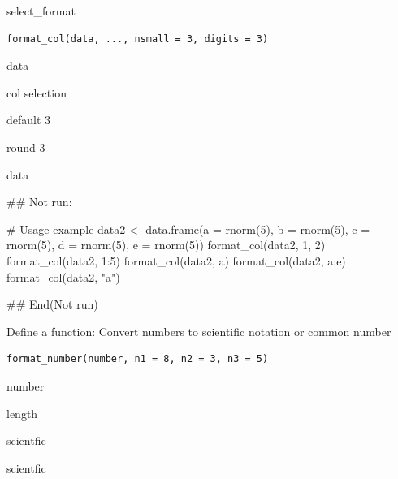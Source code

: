 \documentclass[a4paper]{book}
\begin{document}
%
\begin{Description}
select\_format
\end{Description}
%
\begin{Usage}
\begin{verbatim}
format_col(data, ..., nsmall = 3, digits = 3)
\end{verbatim}
\end{Usage}
%
\begin{Arguments}
\begin{ldescription}
\item[\code{data}] data

\item[\code{...}] col selection

\item[\code{nsmall}] default 3

\item[\code{digits}] round 3
\end{ldescription}
\end{Arguments}
%
\begin{Value}
data
\end{Value}
%
\begin{Examples}
\begin{ExampleCode}


\#\# Not run: 


# Usage example
data2 <- data.frame(a = rnorm(5), b = rnorm(5), c = rnorm(5), d = rnorm(5), e = rnorm(5))
format_col(data2, 1, 2)
format_col(data2, 1:5)
format_col(data2, a)
format_col(data2, a:e)
format_col(data2, "a")

## End(Not run)
\end{ExampleCode}
\end{Examples}
%
\begin{Description}
Define a function: Convert numbers to scientific notation or common number
\end{Description}
%
\begin{Usage}
\begin{verbatim}
format_number(number, n1 = 8, n2 = 3, n3 = 5)
\end{verbatim}
\end{Usage}
%
\begin{Arguments}
\begin{ldescription}
\item[\code{number}] number

\item[\code{n1}] length

\item[\code{n2}] scientfic

\item[\code{n3}] scientfic
\end{ldescription}
\end{Arguments}
\end{document}
